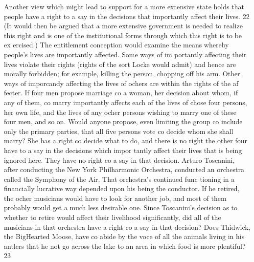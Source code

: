 \documentclass[11pt,openany]{book}
\begin{document}
Another view which might lead to support for a more extensive state holds that people have a right to a say in the decisions that importantly affect their lives. 22 (It would then be argued that a more extensive government is needed to realize this right and is one of the institutional forms through which this right is to be ex ercised.) The entitlement conception would examine the means whereby people's lives are importantly affected. Some ways of im portantly affecting their lives violate their rights (rights of the sort Locke would admit) and hence are morally forbidden; for example, killing the person, chopping off his arm. Other ways of imporcandy affecting the lives of ochers are within the rights of the af fecter. If four men propose marriage co a woman, her decision about whom, if any of them, co marry importantly affects each of the lives of chose four persons, her own life, and the lives of any ocher persons wishing to marry one of these four men, and so on. Would anyone propose, even limiting the group co include only the primary parties, that all five persons vote co decide whom she shall marry? She has a right co decide what to do, and there is no right the other four have to a say in the decisions which impor tantly affect their lives that is being ignored here. They have no right co a say in that decision. Arturo Toscanini, after conducting the New York Philharmonic Orchestra, conducted an orchestra called the Symphony of the Air. That orchestra's continued func tioning in a financially lucrative way depended upon his being the conductor. If he retired, the ocher musicians would have to look for another job, and most of them probably would get a much less desirable one. Since Toscanini's decision as to whether to retire would affect their livelihood significantly, did all of the musicians in that orchestra have a right co a say in that decision? Does Thidwick, the BigHearted Moose, have co abide by the voce of all the animals living in his antlers that he not go across the lake to an area in which food is more plentiful? 23 
\end{document}
